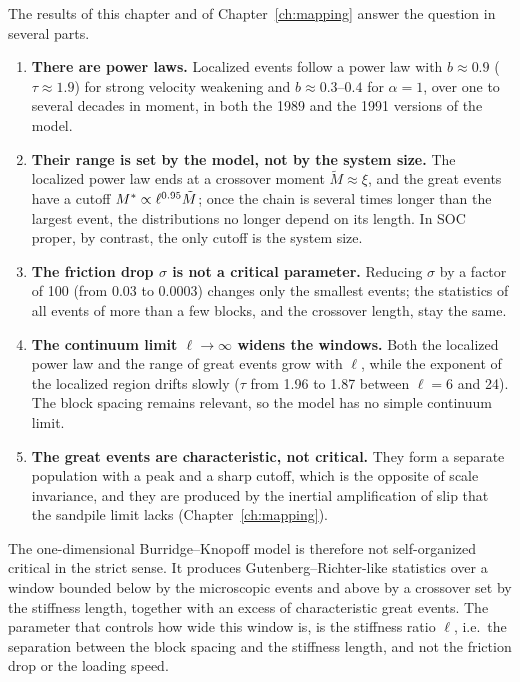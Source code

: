 The results of this chapter and of Chapter~\ref{ch:mapping} answer the question in several parts.
\begin{enumerate}
  \item \textbf{There are power laws.} Localized events follow a power law with $b\approx0.9$ ($\tau\approx1.9$) for strong velocity weakening and
    $b\approx0.3$--$0.4$ for $\alpha=1$, over one to several decades in moment, in both the 1989 and the 1991 versions of the model.
  \item \textbf{Their range is set by the model, not by the system size.} The localized power law ends at a crossover moment $\tilde M\approx\xi$, and the
    great events have a cutoff $M^*\propto\ell^{0.95}\tilde M$; once the chain is several times longer than the largest event, the distributions no longer
    depend on its length. In SOC proper, by contrast, the only cutoff is the system size.
  \item \textbf{The friction drop $\sigma$ is not a critical parameter.} Reducing $\sigma$ by a factor of 100 (from 0.03 to 0.0003) changes only the smallest events; the statistics of all events
    of more than a few blocks, and the crossover length, stay the same.
  \item \textbf{The continuum limit $\ell\to\infty$ widens the windows.} Both the localized power law and the range of great events grow with $\ell$, while the exponent
    of the localized region drifts slowly ($\tau$ from 1.96 to 1.87 between $\ell = 6$ and 24). The block spacing remains relevant, so the model has no simple continuum
    limit.
  \item \textbf{The great events are characteristic, not critical.} They form a separate population with a peak and a sharp cutoff, which is the opposite of scale
    invariance, and they are produced by the inertial amplification of slip that the sandpile limit lacks (Chapter~\ref{ch:mapping}).
\end{enumerate}
The one-dimensional Burridge--Knopoff model is therefore not self-organized critical in the strict sense. It produces Gutenberg--Richter-like statistics over a window
bounded below by the microscopic events and above by a crossover set by the stiffness length, together with an excess of characteristic great events. The parameter that
controls how wide this window is, is the stiffness ratio $\ell$, i.e.\ the separation between the block spacing and the stiffness length, and not the friction drop or the
loading speed.
